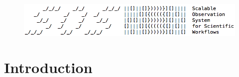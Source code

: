 %
\begin{figure}[h]
\centering
\includegraphics[width=\columnwidth]{images/sosflow_masthead.png}
\label{fig_masthead}
\end{figure}
%
\section{Introduction}
%

%
%
